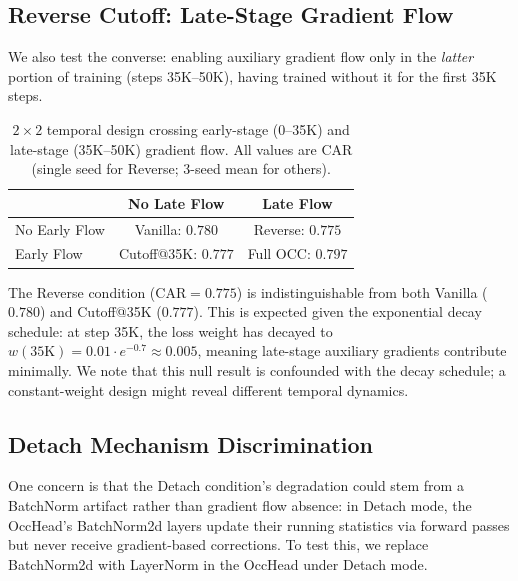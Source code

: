 \documentclass[letterpaper]{article}
\begin{document}
\subsection{Reverse Cutoff: Late-Stage Gradient Flow}
\label{sec:reverse}

We also test the converse: enabling auxiliary gradient flow only in the \emph{latter} portion of training (steps 35K--50K), having trained without it for the first 35K steps.

\begin{table}[h]
\centering
\caption{$2 \times 2$ temporal design crossing early-stage (0--35K) and late-stage (35K--50K) gradient flow. All values are CAR (single seed for Reverse; 3-seed mean for others).}
\label{tab:2x2}
\small
\begin{tabular}{lcc}
\toprule
 & \textbf{No Late Flow} & \textbf{Late Flow} \\
\midrule
No Early Flow & Vanilla: $0.780$ & Reverse: $0.775$ \\
Early Flow    & Cutoff@35K: $0.777$ & Full OCC: $0.797$ \\
\bottomrule
\end{tabular}
\end{table}

The Reverse condition (CAR$=0.775$) is indistinguishable from both Vanilla ($0.780$) and Cutoff@35K ($0.777$).
This is expected given the exponential decay schedule: at step 35K, the loss weight has decayed to $w(35\text{K})=0.01 \cdot e^{-0.7} \approx 0.005$, meaning late-stage auxiliary gradients contribute minimally.
We note that this null result is confounded with the decay schedule; a constant-weight design might reveal different temporal dynamics.

\subsection{Detach Mechanism Discrimination}
\label{sec:detach_ln}

One concern is that the Detach condition's degradation could stem from a BatchNorm artifact rather than gradient flow absence: in Detach mode, the OccHead's BatchNorm2d layers update their running statistics via forward passes but never receive gradient-based corrections.
To test this, we replace BatchNorm2d with LayerNorm in the OccHead under Detach mode.
\end{document}
